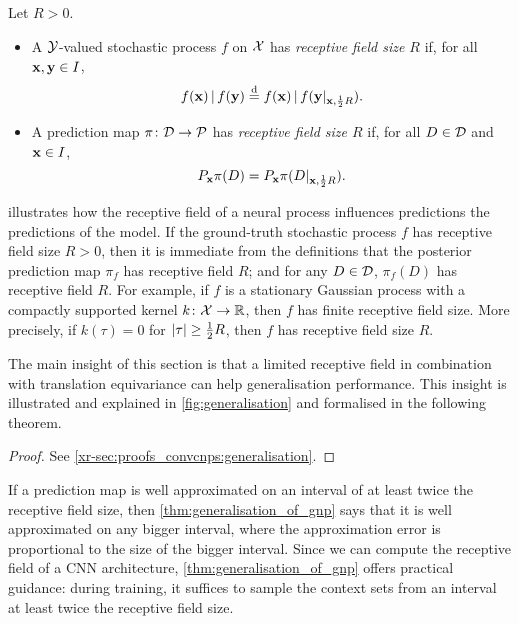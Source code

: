 \documentclass[12pt]{report}
\newcommand{\xrprefix}[1]{xr-#1}
\begin{document}
\begin{definition}
    \label{def:receptive_field}
    Let $R > 0$.
    \begin{itemize}
        \item
            A $\mathcal{Y}$-valued stochastic process $f$ on $\mathcal{X}$ has \emph{receptive field size $R$}
            if, for all $\mathbf{x}, \mathbf{y} \in I$,
            \begin{equation}
                f(\vx) \cond f(\vy) \disteq f(\vx) \cond f(\vy|_{\vx,\frac 12R}).
            \end{equation}
        \item 
            A prediction map $\pi \colon \mathcal{D} \to \mathcal{P}$ has \emph{receptive field size $R$}
            if, for all $D \in \mathcal{D}$ and $\mathbf{x} \in I$,
            \begin{equation}
                P_{\mathbf{x}} \pi(D) = P_{\mathbf{x}} \pi(D|_{\mathbf{x}, \frac12 R}).
            \end{equation}
    \end{itemize}
\end{definition}

 illustrates how the receptive field of a neural process influences predictions the predictions of the model.
If the ground-truth stochastic process $f$ has receptive field size $R > 0$, then it is immediate from the definitions that
the posterior prediction map $\pi_f$ has receptive field $R$; and
for any $D \in \mathcal{D}$, $\pi_f(D)$ has receptive field $R$.
For example, if $f$ is a stationary Gaussian process with a compactly supported kernel $k \colon \mathcal{X} \to \mathbb{R}$, then $f$ has finite receptive field size.
More precisely, if $k(\tau) = 0$ for $\lvert\tau\rvert \ge \tfrac12 R$, then $f$ has receptive field size $R$.

The main insight of this section is that a limited receptive field in combination with translation equivariance can help generalisation performance.
This insight is illustrated and explained in \cref{fig:generalisation} and formalised in the following theorem.

\begin{proof}
    See \cref{\xrprefix{sec:proofs_convcnps:generalisation}}.
\end{proof}

If a prediction map is well approximated on an interval of at least twice the receptive field size, then \cref{thm:generalisation_of_gnp} says that it is well approximated on any bigger interval, where the approximation error is proportional to the size of the bigger interval.
Since we can compute the receptive field of a CNN architecture, \cref{thm:generalisation_of_gnp} offers practical guidance: 
during training, it suffices to sample the context sets from an interval at least twice the receptive field size.
\end{document}
